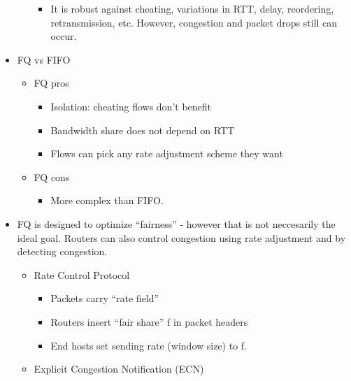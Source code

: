\documentclass[]{article}
\providecommand{\tightlist}{%
  \setlength{\itemsep}{0pt}\setlength{\parskip}{0pt}}
\begin{document}
\begin{itemize}
\begin{itemize}
    \begin{itemize}
    \tightlist
    \item
      It is robust against cheating, variations in RTT, delay,
      reordering, retransmission, etc. However, congestion and packet
      drops still can occur.
    \end{itemize}
  \end{itemize}
\item
  FQ vs FIFO

  \begin{itemize}
  \tightlist
  \item
    FQ pros

    \begin{itemize}
    \tightlist
    \item
      Isolation: cheating flows don't benefit
    \item
      Bandwidth share does not depend on RTT
    \item
      Flows can pick any rate adjustment scheme they want
    \end{itemize}
  \item
    FQ cons

    \begin{itemize}
    \tightlist
    \item
      More complex than FIFO.
    \end{itemize}
  \end{itemize}
\item
  FQ is designed to optimize ``fairness'' - however that is not
  neccesarily the ideal goal. Routers can also control congestion using
  rate adjustment and by detecting congestion.

  \begin{itemize}
  \tightlist
  \item
    Rate Control Protocol

    \begin{itemize}
    \tightlist
    \item
      Packets carry ``rate field''
    \item
      Routers insert ``fair share'' f in packet headers
    \item
      End hosts set sending rate (window size) to f.
    \end{itemize}
  \item
    Explicit Congestion Notification (ECN)


\end{itemize}
\end{itemize}
\end{document}
